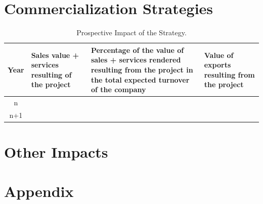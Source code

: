 \documentclass{ani-final}
\begin{document}
\chapter{Commercialization Strategies}
\begin{table}[!htp]
  \centering
  \scriptsize
  
  \begin{tabular}{c|p{}p{}p{}}
    \hline\hline
    \textbf{Year} & \textbf{Sales value + services resulting of the project} & \textbf{Percentage of the value of sales + services rendered resulting from the project in the total expected turnover of the company} & \textbf{Value of exports resulting from the project}\\ \hline
    n   & & & \\ \hline
    n+1 & & & \\ \hline
    \hline
  \end{tabular}
  \caption{Prospective Impact of the Strategy.} 
\end{table}

\chapter{Other Impacts}

\chapter{Appendix}

\nocite{*}


\end{document}
